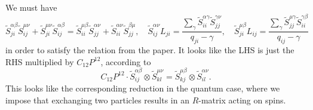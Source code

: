 \documentclass[11pt]{report}
\theoremstyle{definition}
\theoremstyle{remark}
\theoremstyle{remark}
\begin{document}
We must have
\begin{equation*}
\tilde S_{ji}^{\alpha\beta} \tilde S_{ij}^{\mu\nu} + \tilde S_{ji}^{\mu\nu} \tilde S_{ij}^{\alpha\beta} = \tilde S_{ii}^{\mu\beta} \tilde S_{jj}^{\alpha\nu} + \tilde S_{ii}^{\alpha\nu} \tilde S_{jj}^{\beta\mu}, \quad \tilde S_{ij}^{\alpha\nu} L_{ji} = \frac{\sum_\gamma \tilde S_{ii}^{\alpha\gamma} \tilde S_{jj}^{\gamma\nu}}{q_{ji}-\gamma}, \quad \tilde S_{ji}^{\mu\beta} L_{ij} = \frac{\sum_\gamma \tilde S_{jj}^{\mu\gamma} \tilde S_{ii}^{\gamma\beta}}{q_{ij}-\gamma}
\end{equation*}
in order to satisfy the relation from the paper. It looks like the LHS is just the RHS multiplied by $C_{12} P^{12}$, according to
\begin{equation*}
C_{12} P^{12} \cdot \tilde S_{ij}^{\alpha\beta} \otimes \tilde S_{kl}^{\mu\nu} = \tilde S_{kj}^{\mu\beta} \otimes \tilde S_{il}^{\alpha\nu}.
\end{equation*}
This looks like the corresponding reduction in the quantum case, where we impose that exchanging two particles results in an $R$-matrix acting on spins.
\end{document}
